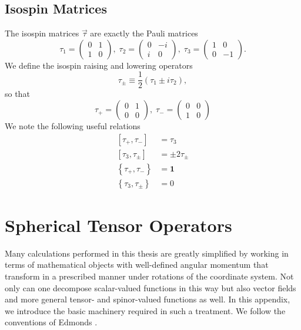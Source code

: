 \documentclass[12pt,letterpaper]{book}
\begin{document}
\section{Isospin Matrices}
The isospin matrices $\vec{\tau}$ are exactly the Pauli matrices
\begin{equation}
\tau_1=\left(\begin{array}{cc}
0 & 1\\
1 & 0
\end{array}\right),\;
\tau_2=\left(\begin{array}{cc}
0 & -i\\
i & 0
\end{array}\right),\;
\tau_3=\left(\begin{array}{cc}
1 & 0\\
0 & -1
\end{array}\right).
\end{equation}
We define the isospin raising and lowering operators
\begin{equation}
\tau_{\pm}\equiv \frac{1}{2}\left(\tau_1\pm i \tau_2\right),
\end{equation}
so that
\begin{equation}
\tau_+=\left(\begin{array}{cc}
0 & 1\\
0 & 0
\end{array}\right),\;\tau_- = \left(\begin{array}{cc}
0 & 0\\
1 & 0
\end{array}\right)
\end{equation}
We note the following useful relations
\begin{equation}
\begin{split}
\left[\tau_+,\tau_-\right]&=\tau_3\\
\left[\tau_3,\tau_{\pm}\right]&=\pm 2\tau_{\pm}\\
\left\{\tau_+,\tau_-\right\}&=\mathbf{1}\\
\left\{\tau_3,\tau_{\pm}\right\}&=0
\end{split}
\end{equation}
\chapter{Spherical Tensor Operators}
\label{app:tensors}
\thispagestyle{headings}
Many calculations performed in this thesis are greatly simplified by working in terms of mathematical objects with well-defined angular momentum that transform in a prescribed manner under rotations of the coordinate system. Not only can one decompose scalar-valued functions in this way but also vector fields and more general tensor- and spinor-valued functions as well. In this appendix, we introduce the basic machinery required in such a treatment. We follow the conventions of Edmonds \cite{edmonds1996angular}. 
\end{document}
